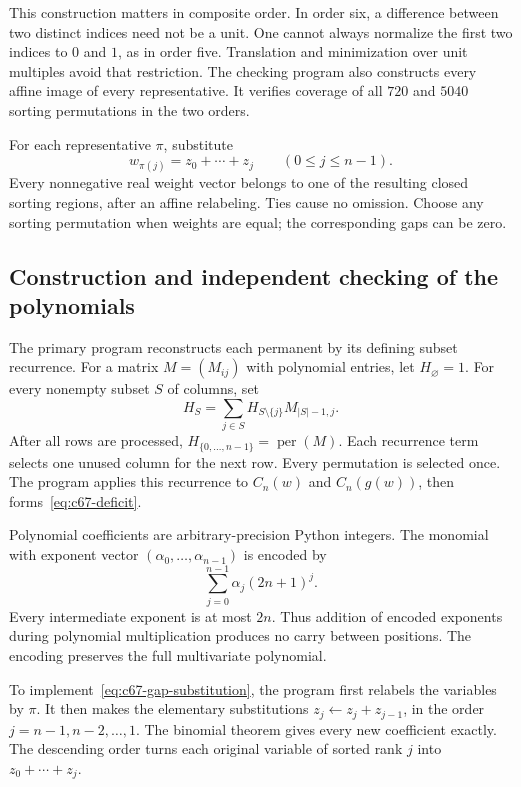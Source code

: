 \documentclass[11pt,a4paper]{article}
\theoremstyle{definition}
\theoremstyle{remark}
\newcommand{\per}{\operatorname{per}}
\begin{document}
This construction matters in composite order. In order six, a difference
between two distinct indices need not be a unit. One cannot always
normalize the first two indices to $0$ and $1$, as in order five.
Translation and minimization over unit multiples avoid that restriction.
The checking program also constructs every affine image of every
representative. It verifies coverage of all $720$ and $5040$ sorting
permutations in the two orders.

For each representative $\pi$, substitute
\begin{equation}\label{eq:c67-gap-substitution}
 w_{\pi(j)}=z_0+\cdots+z_j\qquad(0\le j\le n-1).
\end{equation}
Every nonnegative real weight vector belongs to one of the resulting
closed sorting regions, after an affine relabeling.
Ties cause no omission. Choose any sorting permutation when weights
are equal; the corresponding gaps can be zero.

\subsection{Construction and independent checking of the polynomials}

The primary program reconstructs each permanent by its defining subset
recurrence. For a matrix $M=(M_{ij})$ with polynomial entries, let
$H_\varnothing=1$. For every nonempty subset $S$ of columns, set
\begin{equation}\label{eq:c67-subset}
 H_S=\sum_{j\in S}H_{S\setminus\{j\}}M_{|S|-1,j}.
\end{equation}
After all rows are processed, $H_{\{0,\ldots,n-1\}}=\per(M)$.
Each recurrence term selects one unused column for the next row.
Every permutation is selected once.
The program applies this recurrence to $C_n(w)$ and $C_n(g(w))$, then
forms~\eqref{eq:c67-deficit}.

Polynomial coefficients are arbitrary-precision Python integers.
The monomial with exponent vector $(\alpha_0,\ldots,\alpha_{n-1})$
is encoded by
\[
 \sum_{j=0}^{n-1}\alpha_j(2n+1)^j.
\]
Every intermediate exponent is at most $2n$.
Thus addition of encoded exponents during polynomial multiplication
produces no carry between positions.
The encoding preserves the full multivariate polynomial.

To implement~\eqref{eq:c67-gap-substitution}, the program first relabels
the variables by $\pi$. It then makes the elementary substitutions
$z_j\leftarrow z_j+z_{j-1}$, in the order $j=n-1,n-2,\ldots,1$.
The binomial theorem gives every new coefficient exactly.
The descending order turns each original variable of sorted rank $j$
into $z_0+\cdots+z_j$.
\end{document}
